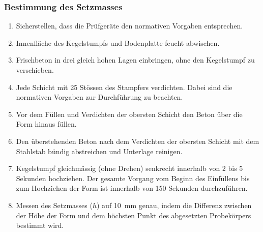 \subsubsection*{Bestimmung des Setzmasses}

\begin{enumerate}
    \item Sicherstellen, dass die Prüfgeräte den normativen Vorgaben entsprechen.
    \item Innenfläche des Kegelstumpfs und Bodenplatte feucht abwischen.
    \item Frischbeton in drei gleich hohen Lagen einbringen, ohne den Kegelstumpf zu verschieben.
    \item Jede Schicht mit 25 Stössen des Stampfers verdichten. Dabei sind die normativen Vorgaben zur Durchführung zu beachten.
    \item Vor dem Füllen und Verdichten der obersten Schicht den Beton über die Form hinaus füllen.
    \item Den überstehenden Beton nach dem Verdichten der obersten Schicht mit dem Stahlstab bündig abstreichen und Unterlage reinigen.
    \item Kegelstumpf gleichmässig (ohne Drehen) senkrecht innerhalb von 2 bis 5 Sekunden hochziehen. Der gesamte Vorgang vom Beginn des Einfüllens bis zum Hochziehen der Form ist innerhalb von 150 Sekunden durchzuführen.
    \item Messen des Setzmasses ($h$) auf \SI{10}{\mm} genau, indem die Differenz zwischen der Höhe der Form und dem höchsten Punkt des abgesetzten Probekörpers bestimmt wird.
\end{enumerate}



 











